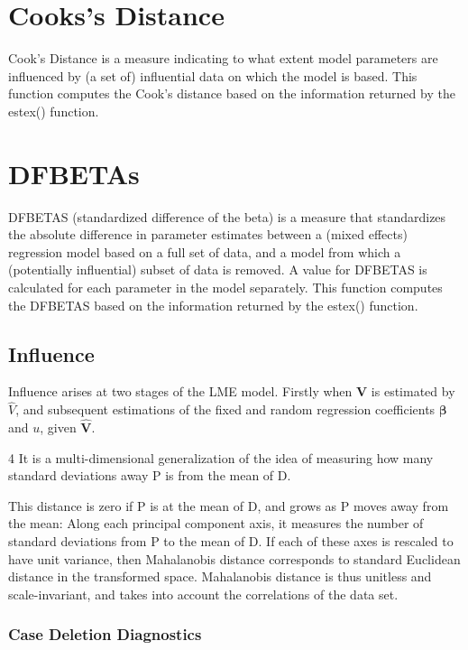 \documentclass[Main.tex]{subfiles}
\begin{document}
	\section{Cooks's Distance}
	Cook's Distance is a measure indicating to what extent model parameters are influenced by (a set of) influential data on which the model is based. This function computes the Cook's distance based on the information returned by the estex() function.
	\section{DFBETAs}
	DFBETAS (standardized difference of the beta) is a measure that standardizes the absolute difference in parameter estimates between a (mixed effects) regression model based on a full set of data, and a model from which a (potentially influential) subset of data is removed. A value for DFBETAS is calculated for each parameter in the model separately. This function computes the DFBETAS based on the information returned by the estex() function.
	
	
	\subsection{Influence}
	
	Influence arises at two stages of the LME model. Firstly when $\mathbf{V}$ is estimated by $\hat{V}$, and subsequent
	estimations of the fixed and random regression coefficients $\mathbf{\beta}$ and $u$, given $\mathbf{\hat{V}}$.
	
	4 It is a multi-dimensional generalization of the idea of measuring how many standard deviations away P is from the mean of D. 
	
	This distance is zero if P is at the mean of D, and grows as P moves away from the mean: Along each principal component axis, it measures the 
	number of standard deviations from P to the mean of D. If each of these axes is rescaled to have unit variance, then Mahalanobis distance corresponds to standard Euclidean distance in the transformed space. Mahalanobis distance is thus unitless and scale-invariant, and takes into account the correlations of the data set.
		\newpage
		\subsubsection{Case Deletion Diagnostics}
		
\end{document}
